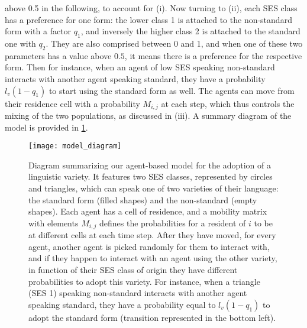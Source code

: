 \documentclass[../thesis.tex]{subfiles}
\begin{document}
above 0.5 in the following, to account for (i). Now turning to (ii), each \ac{SES} class
has a preference for one form: the lower class 1 is attached to the non-standard form
with a factor $q_1$, and inversely the higher class 2 is attached to the standard one
with $q_2$. They are also comprised between 0 and 1, and when one of these two
parameters has a value above $0.5$, it means there is a preference for the respective
form. Then for instance, when an agent of low \ac{SES} speaking non-standard interacts
with another agent speaking standard, they have a probability $l_v (1 - q_1)$ to start
using the standard form as well. The agents can move from their residence cell with a
probability $M_{i,j}$ at each step, which thus controls the mixing of the two
populations, as discussed in (iii). A summary diagram of the model is provided in
\cref{fig:model_diagram}.
\begin{figure}
\centering
  \texttt{[image: model\_diagram]}
  \caption{Diagram summarizing our agent-based model for the adoption of a linguistic
  variety. It features two \ac{SES} classes, represented by circles and triangles, which
  can speak one of two varieties of their language: the standard form (filled shapes)
  and the non-standard (empty shapes). Each agent has a cell of residence, and a
  mobility matrix with elements $M_{i, j}$ defines the probabilities for a resident of
  $i$ to be at different cells at each time step. After they have moved, for every
  agent, another agent is picked randomly for them to interact with, and if they happen
  to interact with an agent using the other variety, in function of their \ac{SES} class
  of origin they have different probabilities to adopt this variety. For instance, when
  a triangle (\ac{SES} 1) speaking non-standard interacts with another agent speaking
  standard, they have a probability equal to $l_v (1 - q_1)$ to adopt the standard form
  (transition represented in the bottom left).}
  \label{fig:model_diagram}
\end{figure}
\end{document}
